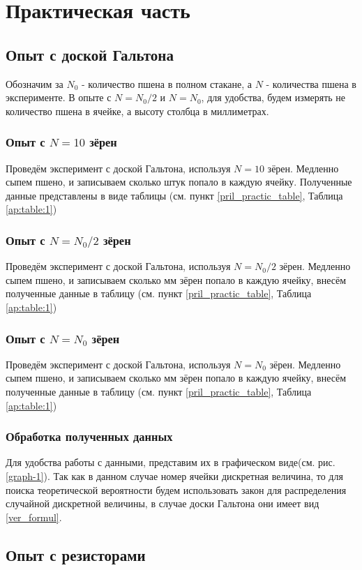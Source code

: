 \section{Практическая часть}



\subsection{Опыт с доской Гальтона}

Обозначим за $N_0$ - количество пшена в полном стакане, а $N$ - количества пшена в эксперименте. В опыте с $N = N_0 / 2$ и $N = N_0$, для удобства, будем измерять не количество пшена в ячейке, а высоту столбца в миллиметрах.
	
\subsubsection{Опыт с $N = 10$ зёрен}

Проведём эксперимент с доской Гальтона, используя $N = 10$ зёрен. Медленно сыпем пшено, и записываем сколько штук попало в каждую ячейку. Полученные данные представлены в виде таблицы (см. пункт \ref{pril_practic_table}, Таблица \ref{ap:table:1})

\subsubsection{Опыт с $N = N_0 / 2$ зёрен}

Проведём эксперимент с доской Гальтона, используя $N = N_0 / 2$ зёрен. Медленно сыпем пшено, и записываем сколько мм зёрен попало в каждую ячейку, внесём полученные данные в таблицу (см. пункт \ref{pril_practic_table}, Таблица \ref{ap:table:1})


\subsubsection{Опыт с $N = N_0$ зёрен} 

Проведём эксперимент с доской Гальтона, используя $N = N_0$ зёрен. Медленно сыпем пшено, и записываем сколько мм зёрен попало в каждую ячейку, внесём полученные данные в таблицу (см. пункт \ref{pril_practic_table}, Таблица \ref{ap:table:1})

\subsubsection{Обработка полученных данных}

Для удобства работы с данными, представим их в графическом виде(см. рис. \ref{graph-1}). Так как в данном случае номер ячейки дискретная величина, то для поиска теоретической вероятности будем использовать закон для распределения случайной дискретной величины, в случае доски Гальтона они имеет вид \eqref{ver_formul}.


\subsection{Опыт с резисторами}

